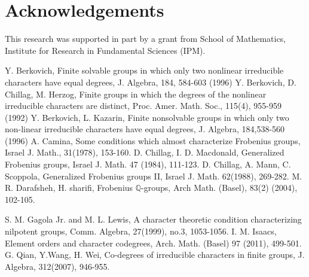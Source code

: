 \documentclass[12pt, oneside, a4paper]{article}
\theoremstyle{definition}
\begin{document}


\section*{Acknowledgements}
This research was supported in part
by a grant  from School of Mathematics, Institute for Research in Fundamental Sciences (IPM).



\begin{thebibliography}{22}
Y. Berkovich, Finite solvable groups in which only two nonlinear irreducible characters have equal degrees, J. Algebra, 184, 584-603 (1996)
%
Y. Berkovich, D. Chillag, M. Herzog, Finite groups in which the degrees of the nonlinear irreducible characters are distinct, Proc. Amer. Math. Soc., 115(4), 955-959 (1992)
%
Y. Berkovich, L. Kazarin, Finite nonsolvable groups in which only two non-linear irreducible characters have equal degrees, J. Algebra, 184,538-560 (1996)
%
A. Camina, Some conditions which almost characterize Frobenius groups, Israel J. Math., 31(1978), 153-160.
%
D. Chillag, I. D. Macdonald, Generalized Frobenius groups, Israel J. Math. 47 (1984), 111-123.
%
D. Chillag, A. Mann, C. Scoppola, Generalized Frobenius groups II, Israel J. Math. 62(1988), 269-282.
%
M. R. Darafsheh, H. sharifi, Frobenius $\mathbb{Q}$-groups, Arch Math. (Basel), 83(2) (2004), 102-105.

S. M. Gagola Jr. and M. L. Lewis, A character theoretic condition characterizing nilpotent groups, Comm. Algebra, 27(1999), no.3, 1053-1056.
%
I. M. Isaacs, Element orders and character codegrees, Arch. Math. (Basel) 97 (2011), 499-501.
%
G. Qian, Y.Wang, H. Wei, Co-degrees of irreducible characters in finite groups, J. Algebra, 312(2007), 946-955.
%

\end{thebibliography}
\end{document}
